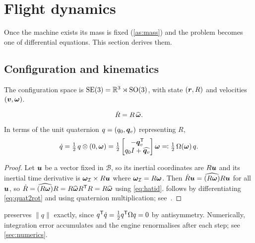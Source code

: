 ﻿\section{Flight dynamics}
\label{sec:dynamics}

Once the machine exists its mass is fixed (\cref{as:mass}) and the problem
becomes one of differential equations. This section derives them.

\subsection{Configuration and kinematics}

The configuration space is $\mathrm{SE}(3) = \mathbb{R}^3\rtimes\mathrm{SO}(3)$, with state
$(\bm{r},R)$ and velocities $(\bm{v},\bm{\omega})$.

\begin{proposition}
\label{prop:kinematics}
\begin{equation}
  \dot{R} = R\,\widehat{\bm{\omega}} .
  \label{eq:Rdot}
\end{equation}
In terms of the unit quaternion $q=(q_0,\bm{q}_v)$ representing $R$,
\begin{equation}
  \dot{q} = \tfrac12\, q \otimes (0,\bm{\omega})
         = \tfrac12
           \begin{bmatrix}
             -\bm{q}_v^{\mathsf{T}} \\
             q_0 I + \widehat{\bm{q}_v}
           \end{bmatrix}\bm{\omega}
         \eqqcolon \tfrac12\,\Omega(\bm{\omega})\,q .
  \label{eq:qdot}
\end{equation}
\end{proposition}

\begin{proof}
Let $\bm{u}$ be a vector fixed in $\mathcal{B}$, so its inertial coordinates
are $R\bm{u}$ and its inertial time derivative is
$\bm{\omega}_{\mathcal I}\times R\bm{u}$ where
$\bm{\omega}_{\mathcal I}=R\bm{\omega}$. Then
$\dot{R}\bm{u} = \widehat{(R\bm{\omega})}R\bm{u}$ for all $\bm{u}$, so
$\dot{R} = \widehat{(R\bm{\omega})}R = R\widehat{\bm{\omega}}R^{\mathsf{T}} R
= R\widehat{\bm{\omega}}$ using \cref{eq:hatid}.  follows by
differentiating \cref{eq:quat2rot} and using quaternion multiplication;
see~\cite[\S1.4]{markley2014}.
\end{proof}

\begin{remark}
 preserves $\|q\|$ exactly, since
$q^{\mathsf{T}}\dot{q} = \tfrac12 q^{\mathsf{T}}\Omega q = 0$ by antisymmetry. Numerically,
integration error accumulates and the engine renormalises after each step; see
\cref{sec:numerics}.
\end{remark}

